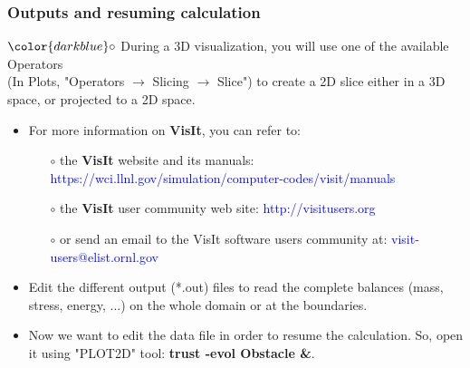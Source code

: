 \documentclass[10pt, hyperref={unicode=true,pdfusetitle, bookmarks=true,bookmarksnumbered=false,bookmarksopen=false, breaklinks=false,pdfborder={0 0 1},backref=true,colorlinks=true,linkcolor=darkblue,pageanchor}]{beamer}
\begin{document}
\begin{frame}
\frametitle{Outputs and resuming calculation}
\begin{block}{}

\hspace{1cm} $\color{darkblue}\circ$ {\small{During a 3D visualization, you will use one of the available Operators \\
\hspace{1.3cm} (In Plots, "Operators $\rightarrow$ Slicing $\rightarrow$ Slice") to create a 2D slice either in a 3D \\
\hspace{1.3cm} space, or projected to a 2D space.}}

\begin{itemize}
\item For more information on \textbf{VisIt}, you can refer to: 
    \begin{itemize}
    \item [$\circ$] the \textbf{VisIt} website and its manuals: \textcolor{blue}{https://wci.llnl.gov/simulation/computer-codes/visit/manuals}
    \item [$\circ$] the \textbf{VisIt} user community web site: \textcolor{blue}{http://visitusers.org}
    \item [$\circ$] or send an email to the VisIt software users community at: \textcolor{blue}{visit-users@elist.ornl.gov}
    \end{itemize}

\item Edit the different output (*.out) files to read the complete balances (mass, stress, energy, ...) on the whole domain or at the boundaries.

\item Now we want to edit the data file in order to resume the calculation. So, open it using "PLOT2D" tool: \textbf{trust -evol Obstacle \&}.
\end{itemize}

\end{block}
\end{frame}
\end{document}
